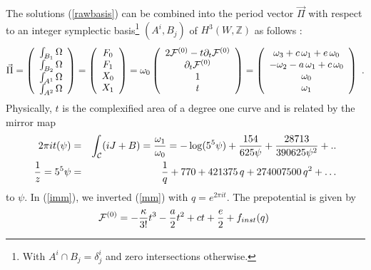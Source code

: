\documentclass[12pt]{article}
\begin{document}
The solutions (\ref{rawbasis}) can be combined into the period vector
$\vec \Pi$ with respect to an integer symplectic basis\footnote{With $A^i\cap B_j=\delta^i_j$
and zero intersections otherwise.} $(A^i,B_j)$ of $H^3(W,\mathbb{Z})$
as follows \cite{Candelas:1990rm}:
\begin{equation}
\vec \Pi  =
\left(
\begin{array}{c}
\int_{B_1} \Omega\\
\int_{B_2} \Omega\\
\int_{A^1} \Omega\\
\int_{A^2} \Omega
\end{array}
\right)=
\left(
\begin{array}{c}
F_0\\
F_1\\
X_0\\
X_1\\
\end{array}
\right)=
\omega_0\left(
\begin{array}{c}
2{\cal F}^{(0)} -t \partial_t {\cal F}^{(0)}\\
\partial_t {\cal F}^{(0)} \\
1\\
t\\
\end{array}
\right)=\left(
\begin{array}{c}
\omega_3+c\, \omega_1+e\, \omega_0 \\
-\omega_2- a\, \omega_1+c \, \omega_0 \\
\omega_0\\
\omega_1 \\
\end{array}
\right)\ .
\label{periods}
\end{equation}
Physically, $t$ is the complexified area of a degree one curve and is related by the mirror map
\begin{eqnarray}
2 \pi i t(\psi)&=&\int_{\cal C} (iJ+ B)=
{\omega_1\over \omega_0}=-\log(5^5\psi)+\frac{154}{625\psi}+\frac{28713}{390625\psi^{2}}+.. \label{mm}\\
{1\over z}=5^5 \psi&=&\frac{1}{q} + 770 + 421375\,q +
274007500\,q^2 +\ldots \label{imm}
\end{eqnarray}
to $\psi$. In (\ref{imm}), we inverted (\ref{mm}) with  $q=e^{2 \pi i t}$.
The prepotential is given by
\begin{equation}
{\cal F}^{(0)}=-{\kappa\over 3!} t^3-{a\over 2}  t^2+ c t+\frac{e}{2}+ f_{inst}(q) \
\label{prepotential}
\end{equation}
\end{document}
